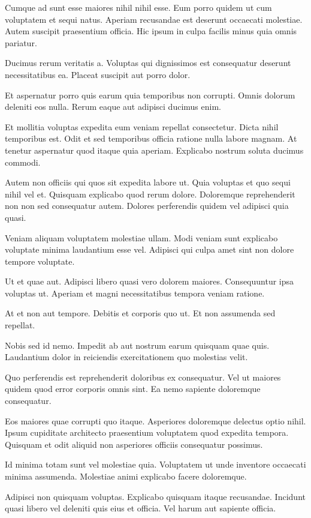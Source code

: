 \documentclass[a4paper]{article}
\begin{document}
\begin{multicols}{2}
Cumque ad sunt esse maiores nihil nihil esse. Eum porro quidem ut cum voluptatem
    et sequi natus. Aperiam recusandae est deserunt occaecati molestiae. Autem
    suscipit praesentium officia. Hic ipsum in culpa facilis minus quia omnis
    pariatur.

Ducimus rerum veritatis a. Voluptas qui dignissimos est consequatur deserunt
    necessitatibus ea. Placeat suscipit aut porro dolor.

Et aspernatur porro quis earum quia temporibus non corrupti. Omnis dolorum
    deleniti eos nulla. Rerum eaque aut adipisci ducimus enim.

Et mollitia voluptas expedita eum veniam repellat consectetur. Dicta nihil
    temporibus est. Odit et sed temporibus officia ratione nulla labore magnam.
    At tenetur aspernatur quod itaque quia aperiam. Explicabo nostrum soluta
    ducimus commodi.

Autem non officiis qui quos sit expedita labore ut. Quia voluptas et quo sequi
nihil vel et. Quisquam explicabo quod rerum dolore. Doloremque reprehenderit non
non sed consequatur autem. Dolores perferendis quidem vel adipisci quia quasi.

Veniam aliquam voluptatem molestiae ullam. Modi veniam sunt explicabo voluptate
minima laudantium esse vel. Adipisci qui culpa amet sint non dolore tempore
voluptate.

Ut et quae aut. Adipisci libero quasi vero dolorem maiores. Consequuntur ipsa
voluptas ut. Aperiam et magni necessitatibus tempora veniam ratione.

At et non aut tempore. Debitis et corporis quo ut. Et non assumenda sed
repellat.

Nobis sed id nemo. Impedit ab aut nostrum earum quisquam quae quis. Laudantium
dolor in reiciendis exercitationem quo molestias velit.

Quo perferendis est reprehenderit doloribus ex consequatur. Vel ut maiores
quidem quod error corporis omnis sint. Ea nemo sapiente doloremque consequatur.

Eos maiores quae corrupti quo itaque. Asperiores doloremque delectus optio
nihil. Ipsum cupiditate architecto praesentium voluptatem quod expedita tempora.
Quisquam et odit aliquid non asperiores officiis consequatur possimus.

Id minima totam sunt vel molestiae quia. Voluptatem ut unde inventore occaecati
minima assumenda. Molestiae animi explicabo facere doloremque.

Adipisci non quisquam voluptas. Explicabo quisquam itaque recusandae. Incidunt
quasi libero vel deleniti quis eius et officia. Vel harum aut sapiente officia.


\end{multicols}
\end{document}
